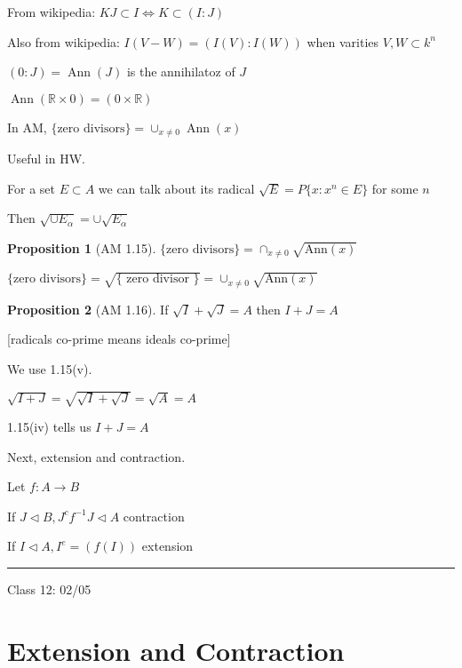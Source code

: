 \documentclass{article}
\theoremstyle{definition}
\newtheorem{proposition}{Proposition}
\begin{document}
From wikipedia: \(KJ \subset I \iff K \subset (I : J)\) 

Also from wikipedia: \(I ( V - W) = (I(V):I(W))\) when varities \(V,W\subset k^n\) 

\((0:J)=\operatorname{Ann }(J) \) is the annihilatoz of \(J\) 

\(\operatorname{Ann}(\mathbb{R} \times 0) = (0\times \mathbb{R} ) \) 

In AM, \(\{ \text{zero divisors} \} = \cup_{x \neq 0} \operatorname{Ann}(x)  \) 

Useful in HW.

For a set \(E \subset A\) we can talk about its radical \(\sqrt{E} = P\{ x : x^n \in E \} \) for some \(n\)

Then \(\sqrt{\cup E_\alpha} = \cup \sqrt{E_{\alpha}}  \) 

\begin{proposition}
    [AM 1.15]

    \(\{ \text{zero divisors}  \} = \cap_{x \neq 0}\sqrt{\text{Ann}(x)} \) 

    \(\{ \text{zero divisors}  \} = \sqrt{\{\text{ zero divisor }\} } = \cup_{x \neq 0} \sqrt{\text{Ann} (x)} \) 

\end{proposition}

\begin{proposition}
    [AM 1.16] If \(\sqrt{I} +\sqrt{J} = A\) then \(I + J = A\)
    
    [radicals co-prime means ideals co-prime]

    We use 1.15(v).

    \(\sqrt{I + J} = \sqrt{\sqrt{I} + \sqrt{J}} = \sqrt{A} = A  \)
    
    1.15(iv) tells us \(I + J = A\) 

    Next, extension and contraction.

    Let \(f : A \to B\) 

    If \(J \triangleleft B, J^c  f^{-1}J \triangleleft A \) contraction
    
    If \(I \triangleleft A, I^e = (f(I))\) extension

\end{proposition}

\hfil
\hrule

Class 12: 02/05

\section*{Extension and Contraction}
\end{document}

